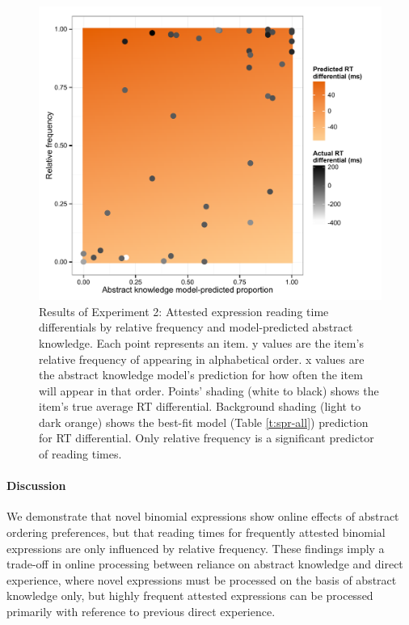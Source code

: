 \documentclass[authoryear]{elsarticle}
\begin{document}
\begin{figure}[t]
\includegraphics[scale=0.7]{spr-attested.pdf}
\caption{Results of Experiment 2: Attested expression reading time differentials by relative frequency and model-predicted abstract knowledge. Each point represents an item. y values are the item's relative frequency of appearing in alphabetical order. x values are the abstract knowledge model's prediction for how often the item will appear in that order. Points' shading (white to black) shows the item's true average RT differential. Background shading (light to dark orange) shows the best-fit model (Table \ref{t:spr-all}) prediction for RT differential. Only relative frequency is a significant predictor of reading times.} \label{fig:spr-freq}
\end{figure}

\paragraph{Discussion}
We demonstrate that novel binomial expressions show online effects of abstract ordering preferences, but 
that reading times for frequently attested binomial expressions are only influenced by relative frequency. These findings imply a trade-off in online processing between reliance on abstract knowledge and direct experience, where novel expressions must be processed on the basis of abstract knowledge only, but highly frequent attested expressions can be processed primarily with reference to previous direct experience.
\end{document}
